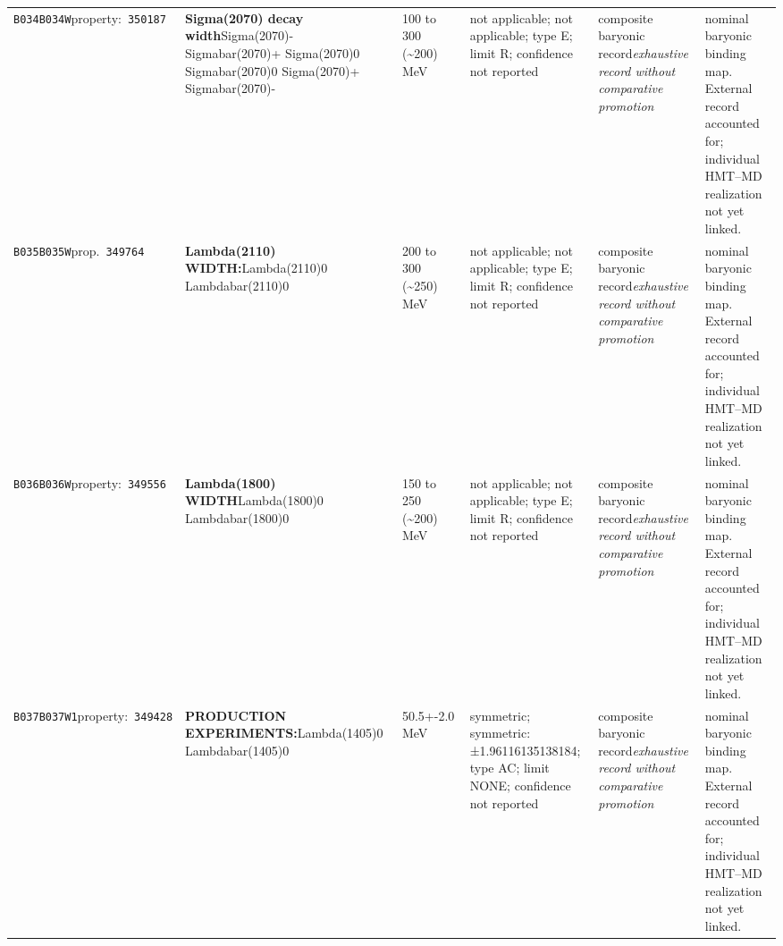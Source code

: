 \begin{landscape}
\begin{longtable}{L{1.85cm}L{4.45cm}L{2.35cm}L{4.05cm}L{3.35cm}L{7.15cm}}
\texttt{B034}\newline \texttt{B034W}\newline property:\ \texttt{350187} & \textbf{Sigma(2070) decay width}\newline Sigma(2070)- \textbar{}\allowbreak{} Sigmabar(2070)+ \textbar{}\allowbreak{} Sigma(2070)0 \textbar{}\allowbreak{} Sigmabar(2070)0 \textbar{}\allowbreak{} Sigma(2070)+ \textbar{}\allowbreak{} Sigmabar(2070)- & 100 to 300 (\textasciitilde{}200)\,MeV & not applicable; not applicable; type E; limit R; confidence not reported & composite baryonic record\newline \emph{exhaustive record without comparative promotion} & nominal baryonic binding map. External record accounted for; individual HMT--MD realization not yet linked. \\
\texttt{B035}\newline \texttt{B035W}\newline prop.\ \texttt{349764} & \textbf{Lambda(2110) WIDTH:}\newline Lambda(2110)0 \textbar{}\allowbreak{} Lambdabar(2110)0 & 200 to 300 (\textasciitilde{}250)\,MeV & not applicable; not applicable; type E; limit R; confidence not reported & composite baryonic record\newline \emph{exhaustive record without comparative promotion} & nominal baryonic binding map. External record accounted for; individual HMT--MD realization not yet linked. \\
\texttt{B036}\newline \texttt{B036W}\newline property:\ \texttt{349556} & \textbf{Lambda(1800) WIDTH}\newline Lambda(1800)0 \textbar{}\allowbreak{} Lambdabar(1800)0 & 150 to 250 (\textasciitilde{}200)\,MeV & not applicable; not applicable; type E; limit R; confidence not reported & composite baryonic record\newline \emph{exhaustive record without comparative promotion} & nominal baryonic binding map. External record accounted for; individual HMT--MD realization not yet linked. \\
\texttt{B037}\newline \texttt{B037W1}\newline property:\ \texttt{349428} & \textbf{PRODUCTION EXPERIMENTS:}\newline Lambda(1405)0 \textbar{}\allowbreak{} Lambdabar(1405)0 & 50.5+-2.0\,MeV & symmetric; symmetric: ±1.96116135138184; type AC; limit NONE; confidence not reported & composite baryonic record\newline \emph{exhaustive record without comparative promotion} & nominal baryonic binding map. External record accounted for; individual HMT--MD realization not yet linked. \\

\end{longtable}
\end{landscape}
